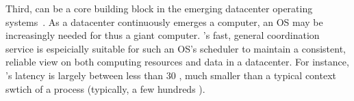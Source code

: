 % 


Third, \xxx can be a core building block in the emerging datacenter operating 
systems~\cite{hotos15, mesos, datacenteros:artical}. As a datacenter 
continuously emerges a computer, an OS may be increasingly needed for thus a 
giant computer. \xxx's fast, general coordination service is espeicially 
suitable for such an OS's scheduler to maintain a consistent, reliable view on 
both computing resources and data in a datacenter. For instance, \xxx's 
latency is largely between less than 30 \us, much smaller than a typical 
context swtich of a process (typically, a few hundreds \us).
